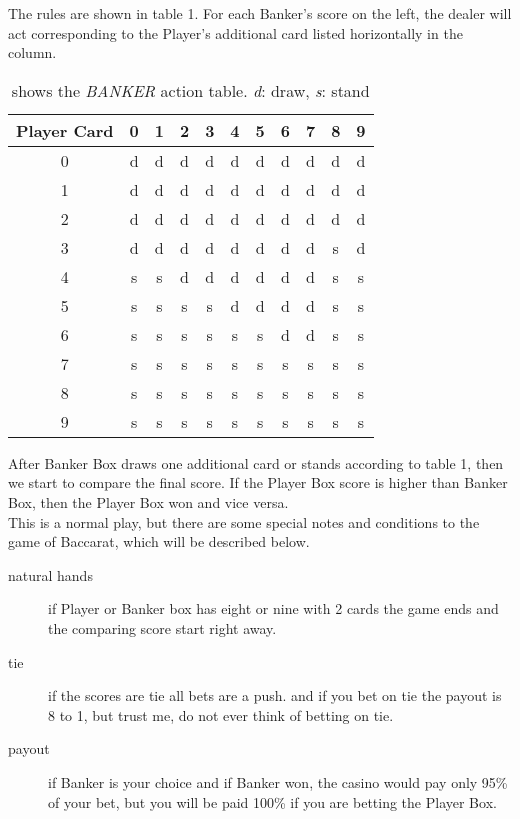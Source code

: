 \documentclass{article}
\begin{document}
The rules are shown in table 1.  For each Banker's score on the left, the dealer will act corresponding to the Player's additional card listed horizontally in the column.\\

\begin{table}[htb]  
\centering
\begin{tabular}{|c|c|c|c|c|c|c|c|c|c|c|}
\hline
Player Card & 0 & 1 & 2 & 3 & 4 & 5 & 6 & 7 & 8 & 9\\
\hline  
0 & d & d & d & d & d & d & d & d & d & d\\
1 & d & d & d & d & d & d & d & d & d & d\\
2 & d & d & d & d & d & d & d & d & d & d\\
3 & d & d & d & d & d & d & d & d & s & d\\
4 & s & s & d & d & d & d & d & d & s & s\\
5 & s & s & s & s & d & d & d & d & s & s\\
6 & s & s & s & s & s & s & d & d & s & s\\
7 & s & s & s & s & s & s & s & s & s & s\\
8 & s & s & s & s & s & s & s & s & s & s\\
9 & s & s & s & s & s & s & s & s & s & s\\
\hline

\end{tabular}
\caption{shows the \emph{BANKER} action table.  \emph{d}: draw, \emph{s}: stand}
\end{table}

After Banker Box draws one additional card or stands according to table 1, then we start to compare the final score.  If the Player Box score is higher than Banker Box, then the Player Box won and vice versa.  \\

This is a normal play, but there are some special notes and conditions to the game of Baccarat, which will be described below.\par

\begin{description}
	\item[natural hands] if Player or Banker box has eight or nine with 2 cards the game ends and the comparing score start right away.
	\item[tie] if the scores are tie all bets are a push.  and if you bet on tie the payout is 8 to 1, but trust me, do not ever think of betting on tie.
	\item[payout] if Banker is your choice and if Banker won, the casino would pay only 95\% of your bet, but you will be paid 100\% if you are betting the Player Box.
\end{description}
\end{document}
